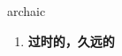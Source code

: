 
\begin{frame}
{\huge archaic}
\begin{center}
\begin{enumerate}\Large
  \item \textbf{过时的，久远的}
\end{enumerate}
\end{center}
\end{frame}
